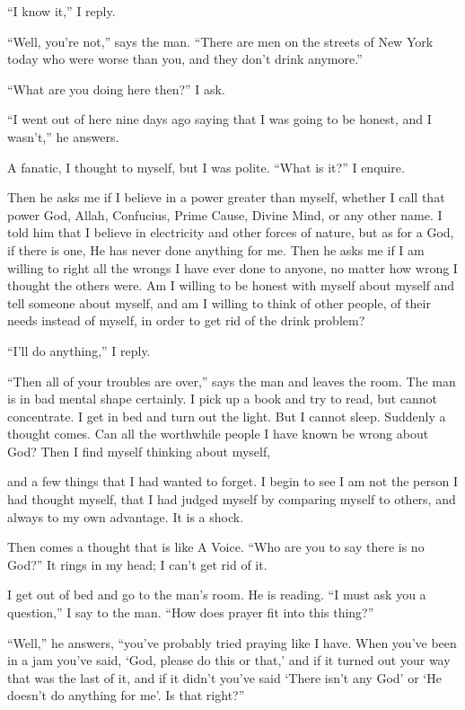 “I know it,” I reply.

“Well, you’re not,” says the man. “There are men on the streets of New York today who were worse than you, and they don’t drink anymore.”

“What are you doing here then?” I ask.

“I went out of here nine days ago saying that I was going to be honest, and I wasn’t,” he answers.

A fanatic, I thought to myself, but I was polite. “What is it?” I enquire.

Then he asks me if I believe in a power greater than myself, whether I call that power God, Allah, Confucius, Prime Cause, Divine Mind, or any other name. I told him that I believe in electricity and other forces of nature, but as for a God, if there is one, He has never done anything for me. Then he asks me if I am willing to right all the wrongs I have ever done to anyone, no matter how wrong I thought the others were. Am I willing to be honest with myself about myself and tell someone about myself, and am I willing to think of other people, of their needs instead of myself, in order to get rid of the drink problem?

“I’ll do anything,” I reply.

“Then all of your troubles are over,” says the man and leaves the room. The man is in bad mental shape certainly. I pick up a book and try to read, but cannot concentrate. I get in bed and turn out the light. But I cannot sleep. Suddenly a thought comes. Can all the worthwhile people I have known be wrong about God? Then I find myself thinking about myself,

and a few things that I had wanted to forget. I begin to see I am not the person I had thought myself, that I had judged myself by comparing myself to others, and always to my own advantage. It is a shock.

Then comes a thought that is like A Voice. “Who are you to say there is no God?” It rings in my head; I can’t get rid of it.

I get out of bed and go to the man’s room. He is reading. “I must ask you a question,” I say to the man. “How does prayer fit into this thing?”

“Well,” he answers, “you’ve probably tried praying like I have. When you’ve been in a jam you’ve said, ‘God, please do this or that,’ and if it turned out your way that was the last of it, and if it didn’t you’ve said ‘There isn’t any God’ or ‘He doesn’t do anything for me’. Is that right?”

